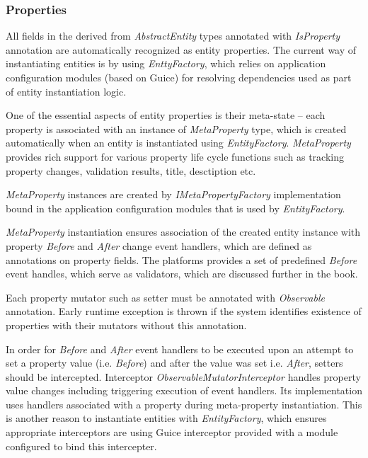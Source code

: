 \subsubsection{Properties}

  All fields in the derived from \emph{AbstractEntity} types annotated with \emph{IsProperty} annotation are automatically recognized as entity properties. The current way of instantiating entities is by using \emph{EnttyFactory}, which relies on application configuration modules (based on Guice) for resolving dependencies used as part of entity instantiation logic.

  One of the essential aspects of entity properties is their meta-state -- each property is associated with an instance of \emph{MetaProperty} type, which is created automatically when an entity is instantiated using \emph{EntityFactory}. 
  \emph{MetaProperty} provides rich support for various property life cycle functions such as tracking property changes, validation results, title, desctiption etc.

  \emph{MetaProperty} instances are created by \emph{IMetaPropertyFactory} implementation bound in the application configuration modules that is used by \emph{EntityFactory}.

  \emph{MetaProperty} instantiation ensures association of the created entity instance with property \emph{Before} and \emph{After} change event handlers, which are defined as annotations on property fields. 
  The platforms provides a set of predefined \emph{Before} event handles, which serve as validators, which are discussed further in the book. 
  
  Each property mutator such as setter must be annotated with \emph{Observable} annotation. 
  Early runtime exception is thrown if the system identifies existence of properties with their mutators without this annotation.

  In order for \emph{Before} and \emph{After} event handlers to be executed upon an attempt to set a property value (i.e. \emph{Before}) and after the value was set {i.e. \emph{After}}, setters should be intercepted. 
  Interceptor \emph{ObservableMutatorInterceptor} handles property value changes including triggering execution of event handlers. 
  Its implementation uses handlers associated with a property during meta-property instantiation. 
  This is another reason to instantiate entities with \emph{EntityFactory}, which ensures appropriate interceptors are using Guice interceptor provided with a module configured to bind this intercepter.

